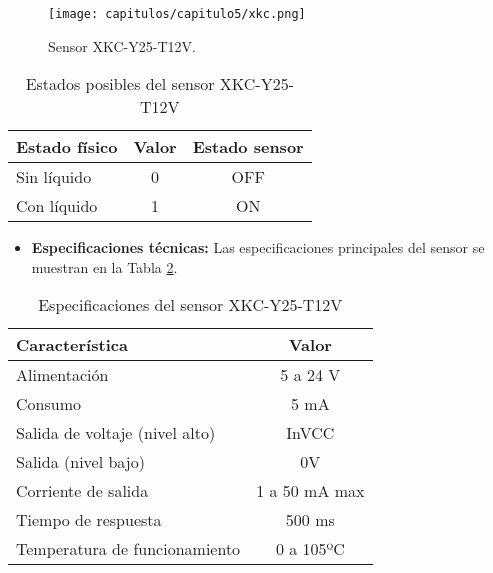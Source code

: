 \begin{enumerate}
\begin{figure}[h] 
    \centering
    \texttt{[image: capitulos/capitulo5/xkc.png]}
    \caption{Sensor XKC-Y25-T12V.}
    \label{fig:XKC-Y25-T12V}
\end{figure}

\begin{table}[h]
    \centering
    \begin{tabular}{|l|c|c|}
        \rowcolor[gray]{.5}
        \hline
         \color{white}Estado físico&\color{white}Valor&\color{white}Estado sensor \\
         \hline
         Sin líquido&0&OFF \\
         \hline
         Con líquido&1&ON  \\
         \hline
    \end{tabular}
    \caption{Estados posibles del sensor XKC-Y25-T12V}
    \label{tab:XKC-Y25-T12V}
\end{table}

\clearpage
\begin{itemize}
    \item \textbf{Especificaciones técnicas:} Las especificaciones principales del sensor se muestran en la Tabla \ref{tab:XKC-Y25-T12Vesp}.
\end{itemize}

\begin{table}[h]
    \centering
    \begin{tabular}{|l|c|}
        \rowcolor[gray]{.5}
        \hline
            \color{white}Característica&\color{white}Valor  \\
        \hline
            Alimentación & 5 a 24 V  \\
        \hline    
            Consumo&5 mA  \\
        \hline    
            Salida de voltaje (nivel alto)&InVCC  \\
        \hline    
            Salida (nivel bajo) & 0V  \\
        \hline    
            Corriente de salida& 1 a 50 mA max  \\
        \hline    
            Tiempo de respuesta& 500 ms  \\
        \hline    
            Temperatura de funcionamiento& 0 a 105ºC  \\
         \hline
    \end{tabular}
    \caption{Especificaciones del sensor XKC-Y25-T12V}
    \label{tab:XKC-Y25-T12Vesp}
\end{table}
\end{enumerate}

